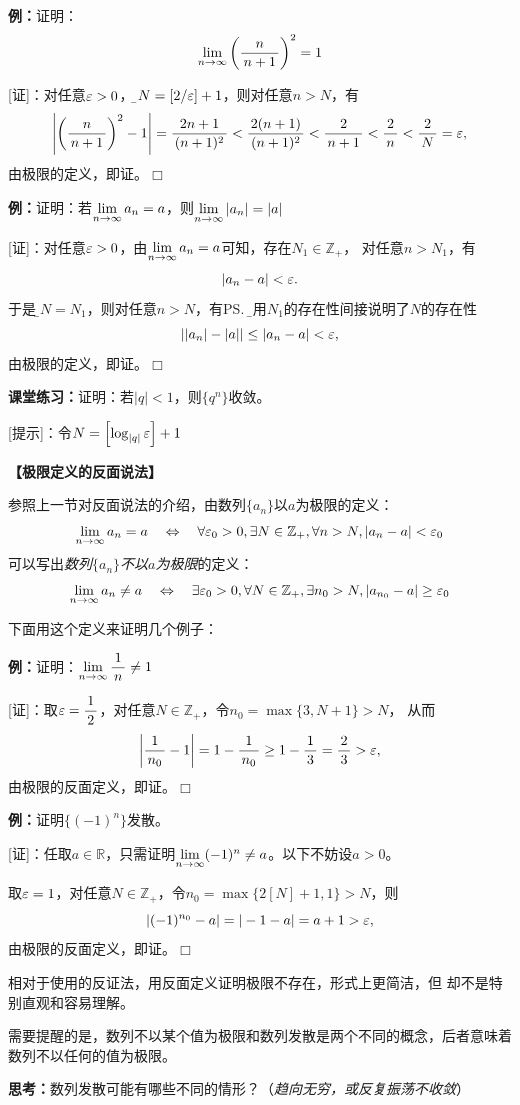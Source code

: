 {\bf 例：}证明：
$$\lim\limits_{n\to\infty}\left(\displaystyle\frac{\,{n}\,}{\,{n+1}\,}\right)^2=1$$

[证]：对任意$\varepsilon>0$，{\b 令$N=\left[2/\varepsilon\right]+1$}，则对任意$n>N$，有
$$\left|\left(\displaystyle\frac{\,{n}\,}{\,{n+1}\,}\right)^2-1\right|=\displaystyle\frac{\,{2n+1}\,}{\,{(n+1)^2}\,}<\displaystyle\frac{\,{2(n+1)}\,}{\,{(n+1)^2}\,}
<\displaystyle\frac{\,{2}\,}{\,{n+1}\,}<\displaystyle\frac{\,{2}\,}{\,{n}\,}<\displaystyle\frac{\,{2}\,}{\,{N}\,}=\varepsilon,$$
由极限的定义，即证。\hfill $\Box$

{\bf 例：}证明：若$\lim\limits_{n\to\infty} a_n=a$，则$\lim\limits_{n\to\infty}|a_n|=|a|$

[证]：对任意$\varepsilon>0$，由$\lim\limits_{n\to\infty} a_n=a$可知，存在$N_1\in\mathbb{Z}_+$，
对任意$n>N_1$，有
$$|a_n-a|<\varepsilon.$$
于是{\b 令$N=N_1$}，则对任意$n>N$，有\ps{\b 利用$N_1$的存在性间接说明了$N$的存在性}
$$||a_n|-|a||\leq|a_n-a|<\varepsilon,$$
由极限的定义，即证。\hfill $\Box$

{\bf 课堂练习：}证明：若$|q|<1$，则$\{q^n\}$收敛。

[提示]：令$N=\left[\log_{|q|}\varepsilon\right]+1$

% 

\begin{shaded}
	{\bf 【极限定义的反面说法】}
	
	参照上一节对反面说法的介绍，由数列$\{a_n\}$以$a$为极限的定义：
	$$\lim\limits_{n\to\infty} a_n= a\quad\Leftrightarrow\quad\forall\varepsilon_0>0,
	\exists N\in\mathbb{Z}_+,\forall n>N,|a_n-a|<\varepsilon_0$$
	可以写出{\it 数列$\{a_n\}$不以$a$为极限}的定义：
	$$\lim\limits_{n\to\infty} a_n\neq a\quad\Leftrightarrow\quad\exists\varepsilon_0>0,
	\forall N\in\mathbb{Z}_+,\exists n_0>N,|a_{n_0}-a|\geq\varepsilon_0$$
	
	下面用这个定义来证明几个例子：
	
	{\bf 例：}证明：$\lim\limits_{n\to\infty}\displaystyle\frac{\,{1}\,}{\,{n}\,}\neq 1$
	
	[证]：取$\varepsilon=\displaystyle\frac{\,{1}\,}{\,{2}\,}$，对任意$N\in\mathbb{Z}_+$，令$n_0=\max\{3,N+1\}>N$，
	从而
	$$\left|\displaystyle\frac{\,{1}\,}{\,{n_0}\,}-1\right|=1-\displaystyle\frac{\,{1}\,}{\,{n_0}\,}\geq 1-\displaystyle\frac{\,{1}\,}{\,{3}\,}=\displaystyle\frac{\,{2}\,}{\,{3}\,}>\varepsilon,$$
	由极限的反面定义，即证。\hfill $\Box$
	
	{\bf 例：}证明$\{(-1)^n\}$发散。
	
	[证]：任取$a\in\mathbb{R}$，只需证明$\lim\limits_{n\to\infty}(-1)^n\ne a$。以下不妨设$a>0$。
	
	取$\varepsilon=1$，对任意$N\in\mathbb{Z}_+$，令$n_0=\max\{2[N]+1,1\}>N$，则
	$$\left|(-1)^{n_0}-a\right|=|-1-a|=a+1>\varepsilon,$$
	由极限的反面定义，即证。\hfill $\Box$
	
	相对于使用的反证法，用反面定义证明极限不存在，形式上更简洁，但
	却不是特别直观和容易理解。
	
	需要提醒的是，数列不以某个值为极限和数列发散是两个不同的概念，后者意味着
	数列不以任何的值为极限。
	
	{\bf 思考：}数列发散可能有哪些不同的情形？\hfill（{\it 趋向无穷，或反复振荡不收敛}）
\end{shaded}

